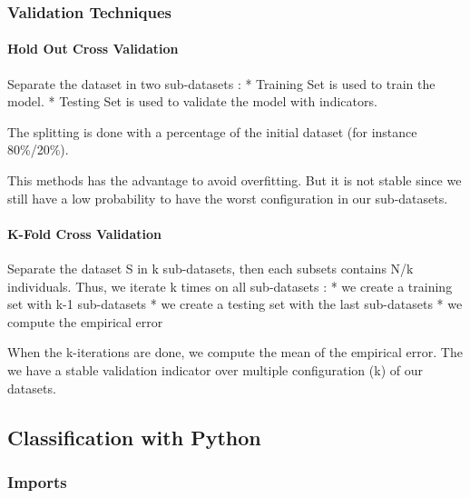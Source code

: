 \documentclass[11pt]{article}
\begin{document}
    \hypertarget{validation-techniques}{%
\subsubsection{Validation Techniques}\label{validation-techniques}}

    \hypertarget{hold-out-cross-validation}{%
\paragraph{Hold Out Cross Validation}\label{hold-out-cross-validation}}

Separate the dataset in two sub-datasets : * Training Set is used to
train the model. * Testing Set is used to validate the model with
indicators.

The splitting is done with a percentage of the initial dataset (for
instance 80\%/20\%).

This methods has the advantage to avoid overfitting. But it is not
stable since we still have a low probability to have the worst
configuration in our sub-datasets.

    \hypertarget{k-fold-cross-validation}{%
\paragraph{K-Fold Cross Validation}\label{k-fold-cross-validation}}

Separate the dataset S in k sub-datasets, then each subsets contains N/k
individuals. Thus, we iterate k times on all sub-datasets : * we create
a training set with k-1 sub-datasets * we create a testing set with the
last sub-datasets * we compute the empirical error

When the k-iterations are done, we compute the mean of the empirical
error. The we have a stable validation indicator over multiple
configuration (k) of our datasets.

    \hypertarget{classification-with-python}{%
\subsection{Classification with
Python}\label{classification-with-python}}

    \hypertarget{imports}{%
\subsubsection{Imports}\label{imports}}
\end{document}
